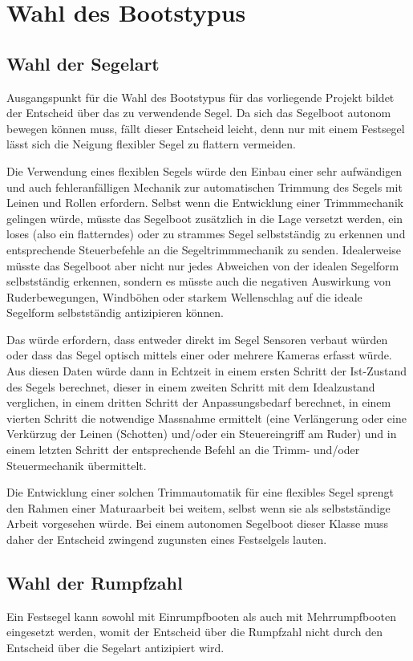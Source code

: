 \section{Wahl des Bootstypus}
\subsection{Wahl der Segelart}
Ausgangspunkt für die Wahl des Bootstypus für das vorliegende Projekt bildet der Entscheid über das zu verwendende Segel. Da sich das Segelboot autonom bewegen können muss, fällt dieser Entscheid leicht, denn nur mit einem Festsegel lässt sich die Neigung flexibler Segel zu flattern vermeiden. 

Die Verwendung eines flexiblen Segels würde den Einbau einer sehr 
aufwändigen und auch fehleranfälligen Mechanik zur automatischen Trimmung des Segels mit Leinen und Rollen erfordern. Selbst wenn die Entwicklung einer Trimmmechanik gelingen würde, müsste das Segelboot zusätzlich in die Lage versetzt werden, ein loses (also ein flatterndes) oder zu strammes Segel selbstständig zu erkennen und entsprechende Steuerbefehle an die Segeltrimmmechanik zu senden. Idealerweise müsste das Segelboot aber nicht nur jedes Abweichen von der idealen Segelform selbstständig erkennen, sondern es müsste auch die negativen Auswirkung von Ruderbewegungen, Windböhen oder starkem Wellenschlag auf die ideale Segelform selbstständig antizipieren können. 

Das würde erfordern, dass entweder direkt im Segel Sensoren verbaut würden oder dass das Segel optisch mittels einer oder mehrere Kameras erfasst würde. Aus diesen Daten würde dann in Echtzeit in einem ersten Schritt der Ist-Zustand des Segels berechnet, dieser in einem zweiten Schritt mit dem Idealzustand verglichen, in einem dritten Schritt der Anpassungsbedarf berechnet, in einem vierten Schritt die notwendige Massnahme ermittelt (eine Verlängerung oder eine Verkürzug der Leinen (Schotten) und/oder ein Steuereingriff am Ruder) und in einem letzten Schritt der entsprechende Befehl an die Trimm- und/oder Steuermechanik übermittelt. 

Die Entwicklung einer solchen Trimmautomatik für eine flexibles Segel sprengt den Rahmen einer Maturaarbeit bei weitem, selbst wenn sie als selbstständige Arbeit vorgesehen würde. Bei einem autonomen Segelboot dieser Klasse muss daher der Entscheid zwingend zugunsten eines Festselgels lauten.
\subsection{Wahl der Rumpfzahl}
Ein Festsegel kann sowohl mit Einrumpfbooten als auch mit Mehrrumpfbooten eingesetzt werden, womit der Entscheid über die Rumpfzahl nicht durch den Entscheid über die Segelart antizipiert wird.  

